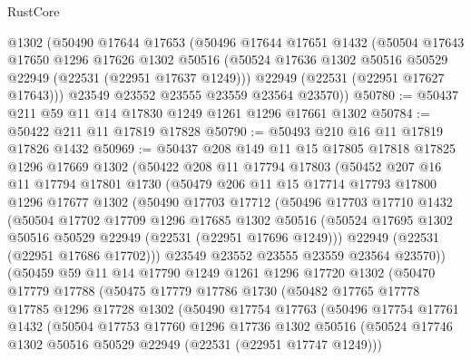 \begin{lexlean}{RustCore}
\begin{coremodule}
    @1302
    (@50490
      @17644
      @17653
      (@50496
        @17644
        @17651
        @1432
        (@50504
          @17643
          @17650
          @1296
          @17626
          @1302
          @50516
          (@50524 @17636 @1302 @50516 @50529 @22949 (@22531 (@22951 @17637 @1249)))
          @22949
          (@22531 (@22951 @17627 @17643)))
        @23549
        @23552
        @23555
        @23559
        @23564
        @23570))
@50780 := @50437 @211 @59 @11 @14 @17830 @1249 @1261 @1296 @17661 @1302
@50784 := @50422 @211 @11 @17819 @17828
@50790 := @50493 @210 @16 @11 @17819 @17826 @1432
@50969 := @50437
    @208
    @149
    @11
    @15
    @17805
    @17818
    @17825
    @1296
    @17669
    @1302
    (@50422
      @208
      @11
      @17794
      @17803
      (@50452
        @207
        @16
        @11
        @17794
        @17801
        @1730
        (@50479
          @206
          @11
          @15
          @17714
          @17793
          @17800
          @1296
          @17677
          @1302
          (@50490
            @17703
            @17712
            (@50496
              @17703
              @17710
              @1432
              (@50504
                @17702
                @17709
                @1296
                @17685
                @1302
                @50516
                (@50524 @17695 @1302 @50516 @50529 @22949 (@22531 (@22951 @17696 @1249)))
                @22949
                (@22531 (@22951 @17686 @17702)))
              @23549
              @23552
              @23555
              @23559
              @23564
              @23570))
          (@50459
            @59
            @11
            @14
            @17790
            @1249
            @1261
            @1296
            @17720
            @1302
            (@50470
              @17779
              @17788
              (@50475
                @17779
                @17786
                @1730
                (@50482
                  @17765
                  @17778
                  @17785
                  @1296
                  @17728
                  @1302
                  (@50490
                    @17754
                    @17763
                    (@50496
                      @17754
                      @17761
                      @1432
                      (@50504
                        @17753
                        @17760
                        @1296
                        @17736
                        @1302
                        @50516
                        (@50524 @17746 @1302 @50516 @50529 @22949 (@22531 (@22951 @17747 @1249)))

\end{coremodule}
\end{lexlean}
